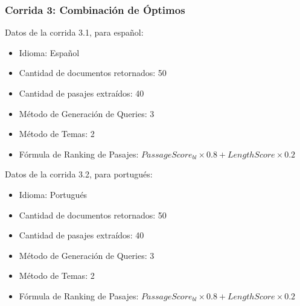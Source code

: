 \begin{frame}
\frametitle{Corrida 3: Combinación de Óptimos}

\medskip

Datos de la corrida 3.1, para español:
\begin{itemize}
  \item Idioma: Español
  \item Cantidad de documentos retornados: 50
  \item Cantidad de pasajes extraídos: 40
  \item Método de Generación de Queries: 3
  \item Método de Temas: 2
  \item Fórmula de Ranking de Pasajes:  $PassageScore_{bl} \times 0.8 + LengthScore \times 0.2$
\end{itemize}
\medskip
Datos de la corrida 3.2, para portugués:
\begin{itemize}
  \item Idioma: Portugués
  \item Cantidad de documentos retornados: 50
  \item Cantidad de pasajes extraídos: 40
  \item Método de Generación de Queries: 3
  \item Método de Temas: 2
  \item Fórmula de Ranking de Pasajes:  $PassageScore_{bl} \times 0.8 + LengthScore \times 0.2$
\end{itemize}

\end{frame}

